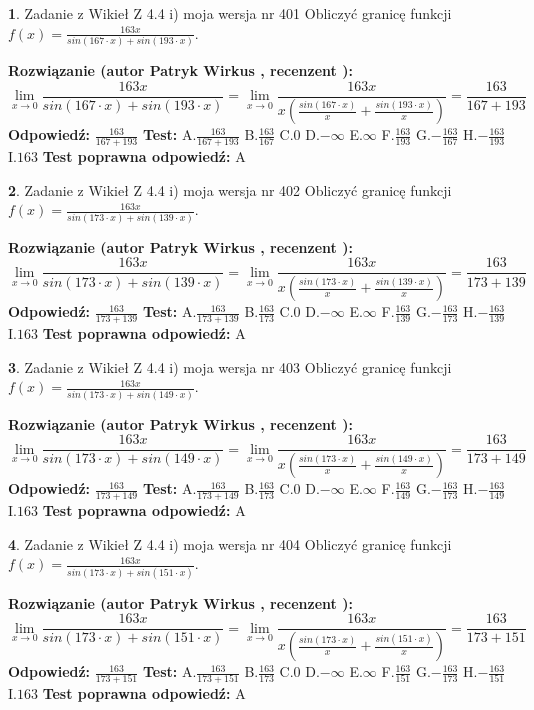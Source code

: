 \documentclass[12pt, a4paper]{article}
\theoremstyle{definition} %
\newtheorem{zad}{}
\newcommand{\zadStart}[1]{\begin{zad}#1\newline}
\newcommand{\zadStop}{\end{zad}}
\newcommand{\rozwStart}[2]{\noindent \textbf{Rozwiązanie (autor #1 , recenzent #2): }\newline}
\newcommand{\rozwStop}{\newline}
\newcommand{\odpStart}{\noindent \textbf{Odpowiedź:}\newline}
\newcommand{\odpStop}{\newline}
\newcommand{\testStart}{\noindent \textbf{Test:}\newline}
\newcommand{\testStop}{\newline}
\newcommand{\kluczStart}{\noindent \textbf{Test poprawna odpowiedź:}\newline}
\newcommand{\kluczStop}{\newline}
\begin{document}
\zadStart{Zadanie z Wikieł Z 4.4 i) moja wersja nr 401}
Obliczyć granicę funkcji $f(x)=\frac{163x}{sin(167\cdot x) +sin(193\cdot x)}$.
\zadStop
\rozwStart{Patryk Wirkus}{}
$$\lim\limits_{x\to 0}\frac{163x}{sin(167\cdot x) +sin(193\cdot x)}=\lim\limits_{x\to 0}\frac{163x}{x(\frac{sin(167\cdot x)}{x}+\frac{sin(193\cdot x)}{x})}=\frac{163}{167+193}$$
\rozwStop
\odpStart
$\frac{163}{167+193}$
\odpStop
\testStart
A.$\frac{163}{167+193}$
B.$\frac{163}{167}$
C.$0$
D.$-\infty$
E.$\infty$
F.$\frac{163}{193}$
G.$-\frac{163}{167}$
H.$-\frac{163}{193}$
I.$163$
\testStop
\kluczStart
A
\kluczStop



\zadStart{Zadanie z Wikieł Z 4.4 i) moja wersja nr 402}
Obliczyć granicę funkcji $f(x)=\frac{163x}{sin(173\cdot x) +sin(139\cdot x)}$.
\zadStop
\rozwStart{Patryk Wirkus}{}
$$\lim\limits_{x\to 0}\frac{163x}{sin(173\cdot x) +sin(139\cdot x)}=\lim\limits_{x\to 0}\frac{163x}{x(\frac{sin(173\cdot x)}{x}+\frac{sin(139\cdot x)}{x})}=\frac{163}{173+139}$$
\rozwStop
\odpStart
$\frac{163}{173+139}$
\odpStop
\testStart
A.$\frac{163}{173+139}$
B.$\frac{163}{173}$
C.$0$
D.$-\infty$
E.$\infty$
F.$\frac{163}{139}$
G.$-\frac{163}{173}$
H.$-\frac{163}{139}$
I.$163$
\testStop
\kluczStart
A
\kluczStop



\zadStart{Zadanie z Wikieł Z 4.4 i) moja wersja nr 403}
Obliczyć granicę funkcji $f(x)=\frac{163x}{sin(173\cdot x) +sin(149\cdot x)}$.
\zadStop
\rozwStart{Patryk Wirkus}{}
$$\lim\limits_{x\to 0}\frac{163x}{sin(173\cdot x) +sin(149\cdot x)}=\lim\limits_{x\to 0}\frac{163x}{x(\frac{sin(173\cdot x)}{x}+\frac{sin(149\cdot x)}{x})}=\frac{163}{173+149}$$
\rozwStop
\odpStart
$\frac{163}{173+149}$
\odpStop
\testStart
A.$\frac{163}{173+149}$
B.$\frac{163}{173}$
C.$0$
D.$-\infty$
E.$\infty$
F.$\frac{163}{149}$
G.$-\frac{163}{173}$
H.$-\frac{163}{149}$
I.$163$
\testStop
\kluczStart
A
\kluczStop



\zadStart{Zadanie z Wikieł Z 4.4 i) moja wersja nr 404}
Obliczyć granicę funkcji $f(x)=\frac{163x}{sin(173\cdot x) +sin(151\cdot x)}$.
\zadStop
\rozwStart{Patryk Wirkus}{}
$$\lim\limits_{x\to 0}\frac{163x}{sin(173\cdot x) +sin(151\cdot x)}=\lim\limits_{x\to 0}\frac{163x}{x(\frac{sin(173\cdot x)}{x}+\frac{sin(151\cdot x)}{x})}=\frac{163}{173+151}$$
\rozwStop
\odpStart
$\frac{163}{173+151}$
\odpStop
\testStart
A.$\frac{163}{173+151}$
B.$\frac{163}{173}$
C.$0$
D.$-\infty$
E.$\infty$
F.$\frac{163}{151}$
G.$-\frac{163}{173}$
H.$-\frac{163}{151}$
I.$163$
\testStop
\kluczStart
A
\kluczStop
\end{document}
